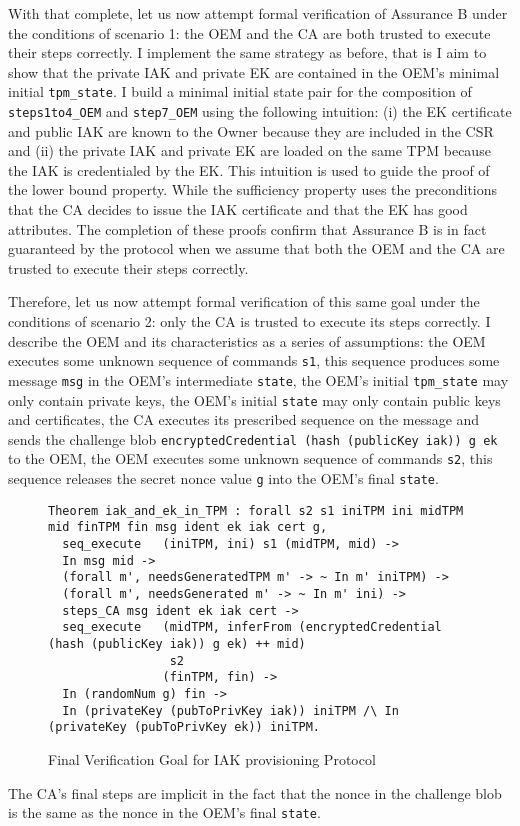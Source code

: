 With that complete, let us now attempt formal verification of Assurance B under the conditions of scenario 1: the OEM and the CA are both trusted to execute their steps correctly. I implement the same strategy as before, that is I aim to show that the private IAK and private EK are contained in the OEM's minimal initial \verb|tpm_state|. I build a minimal initial state pair for the composition of \verb|steps1to4_OEM| and \verb|step7_OEM| using the following intuition: (i) the EK certificate and public IAK are known to the Owner because they are included in the CSR and (ii) the private IAK and private EK are loaded on the same TPM because the IAK is credentialed by the EK. This intuition is used to guide the proof of the lower bound property. While the sufficiency property uses the preconditions that the CA decides to issue the IAK certificate and that the EK has good attributes. The completion of these proofs confirm that Assurance B is in fact guaranteed by the protocol when we assume that both the OEM and the CA are trusted to execute their steps correctly.

Therefore, let us now attempt formal verification of this same goal under the conditions of scenario 2: only the CA is trusted to execute its steps correctly. 
I describe the OEM and its characteristics as a series of assumptions: the OEM executes some unknown sequence of commands \verb|s1|, this sequence produces some message \verb|msg| in the OEM's intermediate \verb|state|, the OEM's initial \verb|tpm_state| may only contain private keys, the OEM's initial \verb|state| may only contain public keys and certificates, the CA executes its prescribed sequence on the message and sends the challenge blob \verb|encryptedCredential (hash (publicKey iak)) g ek| to the OEM, the OEM executes some unknown sequence of commands \verb|s2|, this sequence releases the secret nonce value \verb|g| into the OEM's final \verb|state|. 
\begin{figure}[h]
\begin{lstlisting}[language=Coq]
Theorem iak_and_ek_in_TPM : forall s2 s1 iniTPM ini midTPM mid finTPM fin msg ident ek iak cert g,
  seq_execute   (iniTPM, ini) s1 (midTPM, mid) -> 
  In msg mid ->
  (forall m', needsGeneratedTPM m' -> ~ In m' iniTPM) ->
  (forall m', needsGenerated m' -> ~ In m' ini) ->
  steps_CA msg ident ek iak cert ->
  seq_execute   (midTPM, inferFrom (encryptedCredential (hash (publicKey iak)) g ek) ++ mid) 
                 s2 
                (finTPM, fin) ->
  In (randomNum g) fin ->
  In (privateKey (pubToPrivKey iak)) iniTPM /\ In (privateKey (pubToPrivKey ek)) iniTPM.
\end{lstlisting}
\caption{Final Verification Goal for IAK provisioning Protocol}
\label{fig:iak_goal}
\end{figure}
The CA's final steps are implicit in the fact that the nonce in the challenge blob is the same as the nonce in the OEM's final \verb|state|. 


